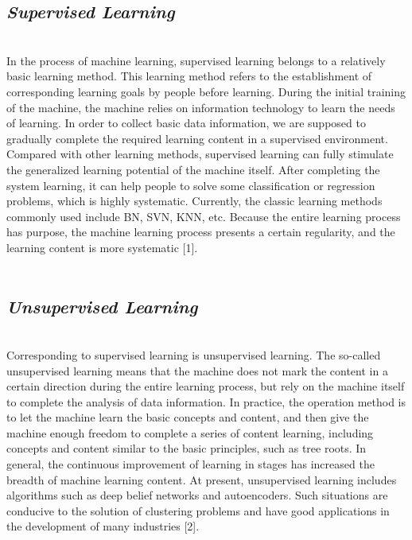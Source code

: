 \documentclass{article}
\begin{document}
\subsection{\emph{Supervised Learning}}\\
In the process of machine learning, supervised learning belongs to a relatively basic learning method. 
This learning method refers to the establishment of corresponding learning goals by people before 
learning. During the initial training of the machine, the machine relies on information technology to 
learn the needs of learning. In order to collect basic data information, we are supposed to gradually 
complete the required learning content in a supervised environment. Compared with other learning 
methods, supervised learning can fully stimulate the generalized learning potential of the machine 
itself. After completing the system learning, it can help people to solve some classification or 
regression problems, which is highly systematic. Currently, the classic learning methods commonly 
used include BN, SVN, KNN, etc. Because the entire learning process has purpose, the machine 
learning process presents a certain regularity, and the learning content is more systematic [1].
\\\\
\subsection{\emph{Unsupervised Learning}}\\
Corresponding to supervised learning is unsupervised learning. The so-called unsupervised learning 
means that the machine does not mark the content in a certain direction during the entire learning process, but rely on the machine itself to complete the analysis of data information. In practice, the 
operation method is to let the machine learn the basic concepts and content, and then give the machine 
enough freedom to complete a series of content learning, including concepts and content similar to the 
basic principles, such as tree roots. In general, the continuous improvement of learning in stages has 
increased the breadth of machine learning content. At present, unsupervised learning includes 
algorithms such as deep belief networks and autoencoders. Such situations are conducive to the 
solution of clustering problems and have good applications in the development of many industries [2].
 \\\\
\end{document}
